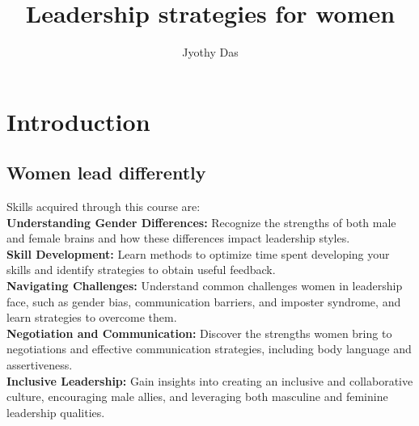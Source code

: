 \documentclass[12pt]{article}
\begin{document}

\title{\textbf{Leadership strategies for women}}

\author{ Jyothy Das}
\maketitle

\newpage
\tableofcontents
\newpage
\listoffigures
\newpage
\listoftables

\newpage
\section{Introduction}
\subsection{Women lead differently}
Skills acquired through this course are:\\
\textbf{Understanding Gender Differences:} Recognize the strengths of both male and female brains and how these differences impact leadership styles.\\
\textbf{Skill Development:} Learn methods to optimize time spent developing your skills and identify strategies to obtain useful feedback.\\
\textbf{Navigating Challenges:} Understand common challenges women in leadership face, such as gender bias, communication barriers, and imposter syndrome, and learn strategies to overcome them.\\
\textbf{Negotiation and Communication:} Discover the strengths women bring to negotiations and effective communication strategies, including body language and assertiveness.\\
\textbf{Inclusive Leadership:} Gain insights into creating an inclusive and collaborative culture, encouraging male allies, and leveraging both masculine and feminine leadership qualities.\\
\end{document}
